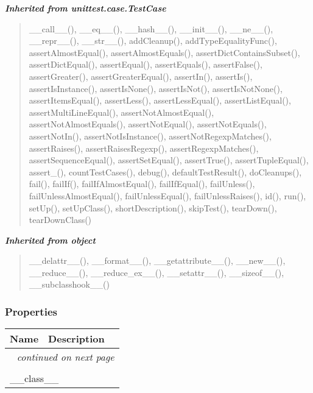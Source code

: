 \large{\textbf{\textit{Inherited from unittest.case.TestCase}}}

\begin{quote}
\_\_call\_\_(), \_\_eq\_\_(), \_\_hash\_\_(), \_\_init\_\_(), \_\_ne\_\_(), \_\_repr\_\_(), \_\_str\_\_(), addCleanup(), addTypeEqualityFunc(), assertAlmostEqual(), assertAlmostEquals(), assertDictContainsSubset(), assertDictEqual(), assertEqual(), assertEquals(), assertFalse(), assertGreater(), assertGreaterEqual(), assertIn(), assertIs(), assertIsInstance(), assertIsNone(), assertIsNot(), assertIsNotNone(), assertItemsEqual(), assertLess(), assertLessEqual(), assertListEqual(), assertMultiLineEqual(), assertNotAlmostEqual(), assertNotAlmostEquals(), assertNotEqual(), assertNotEquals(), assertNotIn(), assertNotIsInstance(), assertNotRegexpMatches(), assertRaises(), assertRaisesRegexp(), assertRegexpMatches(), assertSequenceEqual(), assertSetEqual(), assertTrue(), assertTupleEqual(), assert\_(), countTestCases(), debug(), defaultTestResult(), doCleanups(), fail(), failIf(), failIfAlmostEqual(), failIfEqual(), failUnless(), failUnlessAlmostEqual(), failUnlessEqual(), failUnlessRaises(), id(), run(), setUp(), setUpClass(), shortDescription(), skipTest(), tearDown(), tearDownClass()
\end{quote}

\large{\textbf{\textit{Inherited from object}}}

\begin{quote}
\_\_delattr\_\_(), \_\_format\_\_(), \_\_getattribute\_\_(), \_\_new\_\_(), \_\_reduce\_\_(), \_\_reduce\_ex\_\_(), \_\_setattr\_\_(), \_\_sizeof\_\_(), \_\_subclasshook\_\_()
\end{quote}


  \subsubsection{Properties}

    \vspace{-1cm}
\hspace{\varindent}\begin{longtable}{|p{\varnamewidth}|p{\vardescrwidth}|l}
\cline{1-2}
\cline{1-2} \centering \textbf{Name} & \centering \textbf{Description}& \\
\cline{1-2}
\endhead\cline{1-2}\multicolumn{3}{r}{\small\textit{continued on next page}}\\\endfoot\cline{1-2}
\endlastfoot\multicolumn{2}{|l|}{\textit{Inherited from object}}\\
\multicolumn{2}{|p{\varwidth}|}{\raggedright \_\_class\_\_}\\
\cline{1-2}
\end{longtable}


